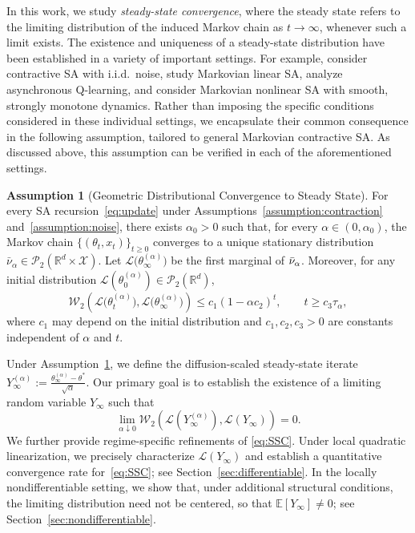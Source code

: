 \documentclass[11pt,letterpaper]{article}
\theoremstyle{plain}
\theoremstyle{definition}
\newtheorem{assumption}{Assumption}
\theoremstyle{remark}
\newcommand{\E}{\mathbb{E}}
\newcommand{\R}{\mathbb{R}}
\newcommand{\W}{\mathcal{W}}
\newcommand{\law}{\mathcal{L}}
\begin{document}
In this work, we study \emph{steady-state convergence}, where the steady state
refers to the limiting distribution of the induced Markov chain as
$t\to\infty$, whenever such a limit exists. The existence and uniqueness of a
steady-state distribution have been established in a variety of important
settings. For example, \cite{dieuleveut2020bridging,zhang2024prelimit} consider contractive SA with
i.i.d.\ noise, \cite{huo2023bias} study Markovian linear SA,
\cite{zhang2024constant} analyze asynchronous Q-learning, and
\cite{huo2024collusion} consider Markovian nonlinear SA with smooth,
strongly monotone dynamics. Rather than imposing the specific conditions considered
in these individual settings, we encapsulate their common consequence in the
following assumption, tailored to general Markovian contractive SA. As
discussed above, this assumption can be verified in each of the aforementioned
settings.
\begin{assumption}[Geometric Distributional Convergence to Steady State]
\label{assumption:convergence}
For every SA recursion~\eqref{eq:update} under
Assumptions~\ref{assumption:contraction} and~\ref{assumption:noise},
there exists $\alpha_0>0$ such that, for every
$\alpha\in(0,\alpha_0)$, the Markov chain $\{(\theta_t,x_t)\}_{t \geq 0}$ converges to a unique stationary distribution $\bar\nu_\alpha\in\mathcal P_2(\R^d\times \mathcal X)$. 
Let $\law\bigl(\theta_\infty^{(\alpha)}\bigr)$ be the first marginal of $\Bar{\nu}_\alpha$.  Moreover, for any initial distribution
$\law(\theta_0^{(\alpha)})\in\mathcal P_2(\mathbb R^d)$,
\[
    \W_2\!\left(
        \law\bigl(\theta_t^{(\alpha)}\bigr),
        \law\bigl(\theta_\infty^{(\alpha)}\bigr)
    \right)
    \leq
    c_1(1-\alpha c_2)^t,
    \qquad
    t\geq c_3\tau_\alpha,
\]
where \(c_1\) may depend on the initial distribution and $c_1,c_2,c_3>0$ are constants independent of $\alpha$ and $t$.
\end{assumption}
Under Assumption~\ref{assumption:convergence}, we define the diffusion-scaled
steady-state iterate $Y_\infty^{(\alpha)}
    :=
    \frac{\theta_\infty^{(\alpha)}-\theta^*}{\sqrt{\alpha}}.$ Our primary goal is to establish the existence of a limiting random variable
$Y_\infty$ such that
\begin{equation}\label{eq:SSC}
    \lim_{\alpha\downarrow 0}
    \W_2\!\left(
        \law\!\left(Y_\infty^{(\alpha)}\right),
        \law(Y_\infty)
    \right)
    =
    0.
\end{equation}
We further provide regime-specific refinements of
\eqref{eq:SSC}. Under local quadratic linearization, we precisely
characterize $\law(Y_\infty)$ and establish a quantitative convergence rate
for~\eqref{eq:SSC}; see Section~\ref{sec:differentiable}. In the locally
nondifferentiable setting, we show that,
under additional structural conditions, the limiting distribution need not be
centered, so that $\E[Y_\infty]\neq 0$; see
Section~\ref{sec:nondifferentiable}.
\end{document}
